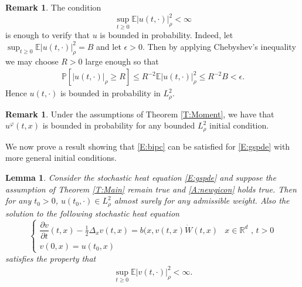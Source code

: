 \documentclass[a4paper,11pt]{article}
\numberwithin{equation}{section}
\theoremstyle{plain}
\newtheorem{lemma}[theorem]{Lemma}
\theoremstyle{definition}
\newtheorem{remark}[theorem]{Remark}
\newcommand{\R}{\mathbb{R}}
\newcommand{\E}{\mathbb{E}}
\begin{document}
 
 \begin{remark}
 	The condition \begin{equation} \sup_{t \ge 0} \E |u(t,\cdot)|_\rho^2 < \infty \label{E:bipc} \end{equation} 
 	is enough to verify that $u$ is bounded in probability. 
	Indeed, let $\sup_{t\ge 0} \E |u(t,\cdot)|_\rho^2 = B$ and let $\epsilon >0$.
	Then by applying Chebyshev's inequality we may choose $R>0$ large enough so that 
 	\begin{align*}
		\mathbb{P}[|u(t,\cdot)|_\rho \ge R] \le R^{-2}\E |u(t,\cdot)|_\rho^2 \le R^{-2}B < \epsilon.
 	\end{align*}  
 	Hence $u(t,\cdot)$ is bounded in probability in $L^2_{\rho}$. 
 \end{remark}

\begin{remark} Under the assumptions of Theorem \ref{T:Moment}, we have that $u^\varphi(t,x)$ is bounded in probability for any bounded $L^2_\rho$ initial condition.
\end{remark} 	
We now prove a result showing that \eqref{E:bipc} can be satisfied for \eqref{E:gspde} with more general initial conditions.  
 
\begin{lemma}
	\label{L:Moments}
	Consider the stochastic heat equation \eqref{E:gspde} and suppose the assumption of Theorem \ref{T:Main} remain true and \eqref{A:newgicon} holds true. Then for any $t_0>0$, $u(t_0,\cdot)\in L^2_\rho$ almost surely for any admissible weight. Also the solution to the following stochastic heat equation
 \begin{equation}
	\label{E:vspde2}
	 \begin{cases}
	 \dfrac{\partial v}{\partial t}(t,x)-\frac{1}{2}\Delta_x v(t,x) = b(x,v(t,x)\dot W(t,x) & \text{$x\in \R^d$ , $t>0$}
	 \\ v(0,x) = u(t_0,x)  & 
	 \end{cases}  
 \end{equation}
satisfies the property that 
\begin{align*}
	 \sup_{t\ge 0} \E |v(t,\cdot)|_\rho^2 < \infty.
\end{align*}
\end{lemma}
\end{document}
